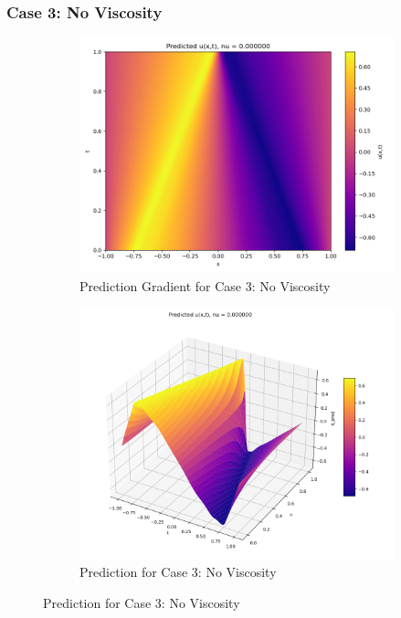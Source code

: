 \documentclass[11pt]{article}
\begin{document}
\subsubsection{Case 3: No Viscosity}
\begin{figure}[h!]
    \centering
    \begin{subfigure}[b]{0.48\textwidth}
        \includegraphics[width=\textwidth]{1D_PredGrad_NU3_Annealing.png}
        \caption{Prediction Gradient for Case 3: No Viscosity}
        \label{fig:PredGrad_NU3_LR}
    \end{subfigure}
    \hfill
    \begin{subfigure}[b]{0.48\textwidth}
        \includegraphics[width=\textwidth]{1D_Pred_NU3_Annealing.png}
        \caption{Prediction for Case 3: No Viscosity}
        \label{fig:Pred_NU3_LR}
    \end{subfigure}
    \caption{Prediction for Case 3: No Viscosity}
    \label{fig:PredTotal_NU3_LR}
\end{figure}
\end{document}
